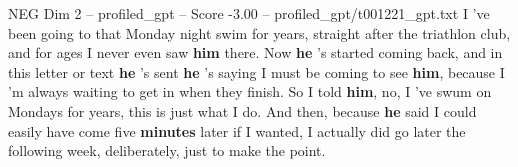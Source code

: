 \begin{textsample}{NEG Dim 2 – profiled\_gpt – Score -3.00 – profiled\_gpt/t001221\_gpt.txt}  \label{ex:f2_neg_033}
I ’ve been going to that Monday night swim for years, straight after the triathlon club, and for ages I never even saw \textbf{him} there.
Now \textbf{he} ’s started coming back, and in this letter or text \textbf{he} ’s sent \textbf{he} ’s saying I must be coming to see \textbf{him}, because I ’m always waiting to get in when they finish.
So I told \textbf{him}, no, I ’ve swum on Mondays for years, this is just what I do.
And then, because \textbf{he} said I could easily have come five \textbf{minutes} later if I wanted, I actually did go later the following week, deliberately, just to make the point.

\end{textsample}
